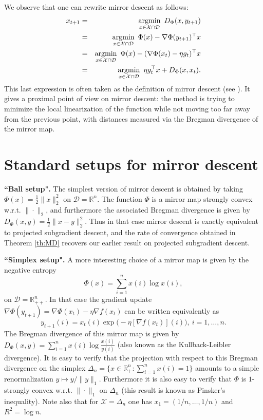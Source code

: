 We observe that one can rewrite mirror descent as follows:
\begin{eqnarray}
x_{t+1} & = & \argmin_{x \in \mathcal{X} \cap \mathcal{D}} \ D_{\Phi}(x,y_{t+1}) \notag \\
& = & \argmin_{x \in \mathcal{X} \cap \mathcal{D}} \ \Phi(x) - \nabla \Phi(y_{t+1})^{\top} x \label{eq:MD3} \\
& = & \argmin_{x \in \mathcal{X} \cap \mathcal{D}} \ \Phi(x) - (\nabla \Phi(x_{t}) - \eta g_t)^{\top} x \notag \\
& = & \argmin_{x \in \mathcal{X} \cap \mathcal{D}} \ \eta g_t^{\top} x + D_{\Phi}(x,x_t) . \label{eq:MDproxview}
\end{eqnarray}
This last expression is often taken as the definition of mirror descent (see \cite{BT03}). It gives a proximal point of view on mirror descent: the method is trying to minimize the local linearization of the function while not moving too far away from the previous point, with distances measured via the Bregman divergence of the mirror map.

\section{Standard setups for mirror descent} \label{sec:mdsetups}
\noindent \textbf{``Ball setup".} The simplest version of mirror descent is obtained by taking $\Phi(x) = \frac{1}{2} \|x\|^2_2$ on $\mathcal{D} = \mathbb{R}^n$. The function $\Phi$ is a mirror map strongly convex w.r.t. $\|\cdot\|_2$, and furthermore the associated Bregman divergence is given by $D_{\Phi}(x,y) = \frac{1}{2} \|x - y\|^2_2$. Thus in that case mirror descent is exactly equivalent to projected subgradient descent, and the rate of convergence obtained in Theorem \ref{th:MD} recovers our earlier result on projected subgradient descent.
\newline

\noindent
\textbf{``Simplex setup".} A more interesting choice of a mirror map is given by the negative entropy
$$\Phi(x) = \sum_{i=1}^n x(i) \log x(i),$$
on $\mathcal{D} = \mathbb{R}_{++}^n$. In that case the gradient update $\nabla \Phi(y_{t+1}) = \nabla \Phi(x_t) - \eta \nabla f(x_t)$ can be written equivalently as
$$y_{t+1}(i) = x_{t}(i) \exp\big(- \eta [\nabla f(x_t) ](i) \big) , \ i=1, \hdots, n.$$
The Bregman divergence of this mirror map is given by $D_{\Phi}(x,y) = \sum_{i=1}^n x(i) \log \frac{x(i)}{y(i)}$ (also known as the Kullback-Leibler divergence). It is easy to verify that the projection with respect to this Bregman divergence on the simplex $\Delta_n = \{x \in \mathbb{R}_+^n : \sum_{i=1}^n x(i) = 1\}$ amounts to a simple renormalization $y \mapsto y / \|y\|_1$. Furthermore it is also easy to verify that $\Phi$ is $1$-strongly convex w.r.t. $\|\cdot\|_1$ on $\Delta_n$ (this result is known as Pinsker's inequality). Note also that for $\mathcal{X} = \Delta_n$ one has $x_1 = (1/n, \hdots, 1/n)$ and $R^2 = \log n$.

